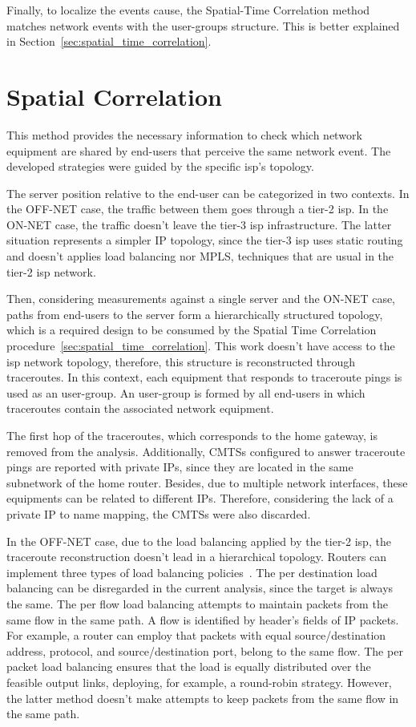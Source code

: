 Finally, to localize the events cause, the Spatial-Time Correlation method
matches network events with the user-groups structure.
This is better explained in Section~\ref{sec:spatial_time_correlation}.

\section{Spatial Correlation}
\label{sec:spatial_correlation}

This method provides the necessary information to check which network equipment
are shared by end-users that perceive the same network event.
The developed strategies were guided by the specific \gls*{isp}'s topology.

The server position relative to the end-user
can be categorized in two contexts.
In the OFF-NET case, the traffic between them
goes through a tier-2 \gls*{isp}\@.
In the ON-NET case, the traffic
doesn't leave the tier-3 \gls*{isp} infrastructure.
The latter situation represents a simpler IP topology, since the tier-3 \gls*{isp}
uses static routing and
doesn't applies load balancing nor MPLS, techniques that are usual in the tier-2
\gls*{isp} network.

Then, considering measurements against a single server and the ON-NET
case, paths from end-users to the server form a hierarchically
structured topology, which is a required design to be consumed by the
Spatial Time Correlation procedure~\ref{sec:spatial_time_correlation}.
This work doesn't have access to the \gls*{isp} network
topology, therefore, this structure is reconstructed through traceroutes.
In this context, each equipment that responds to traceroute
pings is used as an user-group.
An user-group is formed by all end-users in which traceroutes contain the
associated network equipment.

The first hop of the traceroutes, which corresponds to the home gateway, is
removed from the analysis.
Additionally, CMTSs configured to answer traceroute pings are reported
with private IPs,
since they are located in the same subnetwork of the home router.
Besides, due to multiple network interfaces, these equipments can be related
to different IPs.
Therefore, considering the lack of a private IP to name mapping, the CMTSs
were also discarded.

In the OFF-NET case, due to the load balancing applied by the tier-2 \gls*{isp},
the traceroute reconstruction doesn't lead in a hierarchical topology.
Routers can implement three types of load balancing
policies~\cite{avoiding_traceroute_anomalies_with_paris_traceroute}.
The per
destination load balancing can be disregarded in the current analysis, since
the target is always the same. The per flow load balancing attempts to
maintain packets from the same flow in the same path. A flow is identified
by header's fields of IP packets. For example, a
router can employ that packets with equal source/destination
address, protocol, and source/destination port,
belong to the same flow. The per packet load
balancing ensures that the load is equally distributed over the feasible output
links, deploying, for example, a round-robin strategy. However, the latter
method doesn't
make attempts to keep packets from the same flow in the same path.

